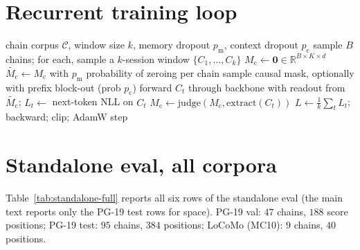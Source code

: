\documentclass{article}
\newcommand{\Mc}{M_{\text{c}}}
\begin{document}



\appendix
\renewcommand{\thetable}{A\arabic{table}}
\renewcommand{\thefigure}{A\arabic{figure}}
\setcounter{table}{0}
\setcounter{figure}{0}

\section{Recurrent training loop}
\label{app:tbptt}

\begin{algorithm}[h]
\caption{Recurrent chain training step (one micro-batch).  Plain
truncated-BPTT, $k$ sessions per window.  Memory-dropout and
context-dropout are applied to the read but not to the recurrent
state update so dropout never poisons $\Mc$.}
\label{alg:tbptt}
\begin{algorithmic}[1]
\Require chain corpus $\mathcal{C}$, window size $k$, memory dropout $p_\text{m}$, context dropout $p_\text{c}$
\State sample $B$ chains; for each, sample a $k$-session window $\{C_1, \dots, C_k\}$
\State $\Mc \gets \mathbf{0} \in \mathbb{R}^{B\times K\times d}$
  \State $\tilde{\Mc} \gets \Mc$ with $p_\text{m}$ probability of zeroing per chain
  \State sample causal mask, optionally with prefix block-out (prob $p_\text{c}$)
  \State forward $C_t$ through backbone with readout from $\tilde{\Mc}$; \quad $L_t \gets$ next-token NLL on $C_t$
  \State $\Mc \gets \mathrm{judge}(\Mc, \mathrm{extract}(C_t))$
\EndFor
\State $L \gets \frac{1}{k} \sum_t L_t$; backward; clip; AdamW step
\end{algorithmic}
\end{algorithm}

\section{Standalone eval, all corpora}
\label{app:standalone}

Table~\ref{tab:standalone-full} reports all six rows of the
standalone eval (the main text reports only the PG-19 test rows for
space).  PG-19 val: $47$ chains, $188$ score positions; PG-19 test:
$95$ chains, $384$ positions; LoCoMo (MC10): $9$ chains, $40$
positions.
\end{document}
